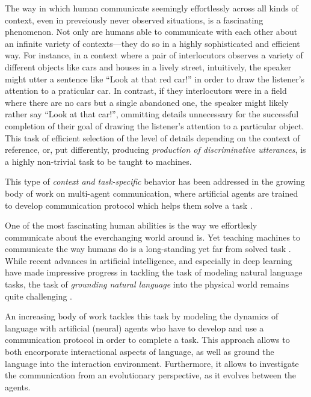 The way in which human communicate seemingly effortlessly across all kinds of context, even in preveiously never observed situations, is a fascinating phenomenon. Not only are humans able to communicate with each other about an infinite variety of contexts---they do so in a highly sophisticated and efficient way. For instance, in a context where a pair of interlocutors observes a variety of different objects like cars and houses in a lively street, intuitively, the speaker might utter a sentence like ``Look at that red car!'' in order to draw the listener's attention to a praticular car. In contrast, if they interlocutors were in a field where there are no cars but a single abandoned one, the speaker might likely rather say ``Look at that car!'', ommitting details unnecessary for the successful completion of their goal of drawing the listener's attention to a particular object. This task of efficient selection of the level of details depending on the context of reference, or, put differently, producing \textit{production of discriminative utterances}, is a highly non-trivial task to be taught to machines. 

This type of \textit{context and task-specific} behavior has been addressed in the growing body of work on multi-agent communication, where artificial agents are trained to develop communication protocol which helps them solve a task .

One of the most fascinating human abilities is the way we effortlesly communicate about the everchanging world around is. Yet teaching machines to communicate the way humans do is a long-standing yet far from solved task . While recent advances in artificial intelligence, and especially in deep learning have made impressive progress in tackling the task of modeling natural language tasks, the task of \textit{grounding natural language} into the physical world remains quite challenging .

An increasing body of work tackles this task by modeling the dynamics of language with artificial (neural) agents who have to develop and use a communication protocol in order to complete a task. This approach allows to both encorporate interactional aspects of language, as well as ground the language into the interaction environment. Furthermore, it allows to investigate the communication from an evolutionary perspective, as it evolves between the agents.


